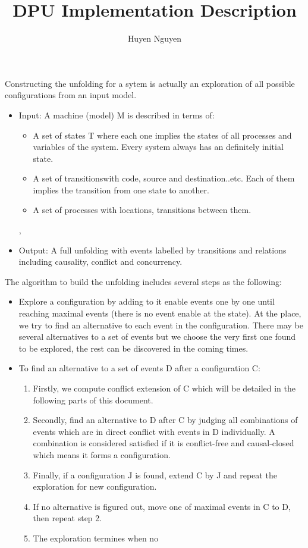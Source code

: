 \documentclass{llncs}
\title{DPU Implementation Description}
\author{Huyen Nguyen}
\institute{Université Paris 13, Sorbonne Paris Cité, LIPN, CNRS, France}
\begin{document}
\maketitle
\noindent
Constructing the unfolding for a sytem is actually an exploration of all possible configurations from an input model.
\begin{itemize}
	\item
	 Input: A machine (model) M is described in terms of:
	 \begin{itemize}
	 	\item
		 	A set of states T where each one implies the states of all processes and variables of the system. Every system always has an definitely initial state.
	 	\item
			A set of transitionswith code, source and destination..etc. Each of them implies the transition from one state to another.
	 	\item 
		 	A set of processes with locations, transitions between them.
		
	 \end{itemize} ,  
	\item Output: A full unfolding with events labelled by transitions and relations including causality, conflict and concurrency.
\end{itemize}

\noindent
The algorithm to build the unfolding includes several steps as the following:
\begin{itemize}
\item
	Explore a configuration by adding to it enable events one by one until reaching maximal events (there is no event enable at the state). At the place, we try to find an alternative to each event in the configuration. There may be several alternatives to a set of events but we choose the very first one found to be explored, the rest can be discovered in the coming times. 
\item
	To find an alternative to a set of events D after a configuration C:
	\begin{enumerate}
		\item 
			Firstly, we compute conflict extension of C which will be detailed in the following parts of this document.
		\item
			Secondly, find an alternative to D after C by judging all combinations of events which are in direct conflict with events in D individually.
			A combination is considered satisfied if it is conflict-free and causal-closed which means it forms a configuration.
		\item
			Finally, if a configuration J is found, extend C by J and repeat the exploration for new configuration.
		\item
			If no alternative is figured out, move one of maximal events in C to D, then repeat step 2.
		\item
			The exploration termines when no
	\end{enumerate}
	 

\end{itemize}
\end{document}
